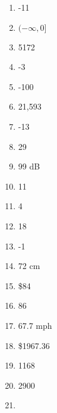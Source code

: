 \documentclass[../uilmath.tex]{subfiles}
\begin{document}
\begin{enumerate}[label=\bfseries\arabic*.]
    \item %
    -11

    \item %
    $(-\infty, 0]$

    \item %
    5172

    \item %
    -3

    \item %
    -100

    \item %
    21,593

    \item %
    -13

    \item %
    29

    \item %
    99 dB

    \item %
    11
    
    \item %
    4

    \item %
    18

    \item %
    -1

    \item %
    72 cm 

    \item %
    \$84 

    \item %
    86

    \item %
    67.7 mph 

    \item %
    \$1967.36

    \item %
    1168

    \item %
    2900

    \item %
    
\end{enumerate}
\end{document}
